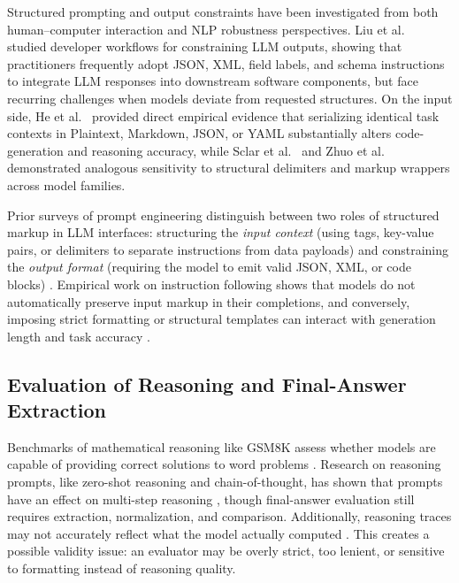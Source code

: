 \documentclass[a4paper,fleqn]{cas-sc}
\begin{document}
Structured prompting and output constraints have been investigated from both human--computer interaction and NLP robustness perspectives. Liu et al.\ \citep{liu2024structuredoutput} studied developer workflows for constraining LLM outputs, showing that practitioners frequently adopt JSON, XML, field labels, and schema instructions to integrate LLM responses into downstream software components, but face recurring challenges when models deviate from requested structures. On the input side, He et al.\ \citep{he2024formatting} provided direct empirical evidence that serializing identical task contexts in Plaintext, Markdown, JSON, or YAML substantially alters code-generation and reasoning accuracy, while Sclar et al.\ \citep{sclar2023spurious} and Zhuo et al.\ \citep{zhuo2024prosa} demonstrated analogous sensitivity to structural delimiters and markup wrappers across model families.

Prior surveys of prompt engineering distinguish between two roles of structured markup in LLM interfaces: structuring the \emph{input context} (using tags, key-value pairs, or delimiters to separate instructions from data payloads) and constraining the \emph{output format} (requiring the model to emit valid JSON, XML, or code blocks) \citep{schulhoff2024promptreport, zhou2023ifeval}. Empirical work on instruction following shows that models do not automatically preserve input markup in their completions, and conversely, imposing strict formatting or structural templates can interact with generation length and task accuracy \citep{zhou2023ifeval, liu2024structuredoutput}.

\subsection{Evaluation of Reasoning and Final-Answer
Extraction}\label{evaluation-of-reasoning-and-final-answer-extraction}

Benchmarks of mathematical reasoning like GSM8K assess whether models are capable of providing correct solutions to word problems \citep{cobbe2021gsm8k}. Research on reasoning prompts, like zero-shot reasoning and chain-of-thought, has shown that prompts have an effect on multi-step reasoning \citep{wei2022cot, kojima2022zeroshot}, though final-answer evaluation still requires extraction, normalization, and comparison. Additionally, reasoning traces may not accurately reflect what the model actually computed \citep{turpin2023unfaithful}. This creates a possible validity issue: an evaluator may be overly strict, too lenient, or sensitive to formatting instead of reasoning quality.
\end{document}
